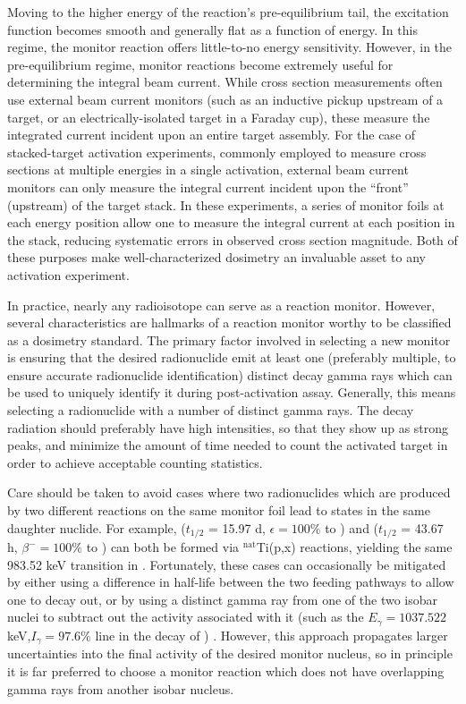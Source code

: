 \documentclass[3p]{elsarticle}
\begin{document}
Moving to the higher energy  of the reaction's pre-equilibrium tail, the excitation function becomes  smooth and generally flat as a function of energy.
In this regime, the monitor reaction offers little-to-no energy sensitivity. 
However,  in the pre-equilibrium regime, monitor reactions become extremely useful for determining the integral beam current. 
While cross section measurements often use external beam current monitors (such as an inductive pickup upstream of a target, or an electrically-isolated target in a Faraday cup), these measure the integrated current incident upon an entire target assembly.
For the case of stacked-target activation experiments, commonly employed to measure cross sections at multiple energies  in a single activation, external beam current monitors can only measure the integral current incident upon the \enquote{front} (upstream) of the target stack.
In these experiments, a series of monitor foils at each energy position allow one to measure the integral current at each position in the stack, reducing systematic errors in observed cross section magnitude.
Both of these purposes make well-characterized dosimetry an invaluable asset to any activation experiment. 



In practice, nearly any radioisotope can serve as a reaction monitor. 
However, several characteristics are hallmarks of a reaction monitor worthy to be classified as a dosimetry standard.
The primary factor involved in selecting a new monitor is ensuring that the desired radionuclide emit  at least one (preferably multiple, to ensure accurate radionuclide identification) distinct decay gamma rays which can be used to uniquely identify it during post-activation assay.  
Generally, this means selecting a radionuclide with a number of distinct gamma rays.
The decay radiation should preferably have high intensities, so that they show up as strong peaks, and minimize the amount of time needed to count the activated target in order to achieve acceptable counting statistics. 

Care should be taken to avoid cases where two radionuclides which are produced by two different reactions on the same monitor foil lead to states in the same daughter nuclide.  
For example,   ($t_{1/2}$ = 15.97 d, $\epsilon=100\%$ to ) and   ($t_{1/2}$ = 43.67 h, $\beta^-=100\%$ to ) can both be formed via $^\text{nat}$Ti(p,x) reactions, yielding the same 983.52 keV transition in  \cite{Burrows2006}.
Fortunately, these cases can occasionally be mitigated by either using a difference in half-life between the two feeding pathways to allow one to decay out, or by using a distinct gamma ray from one of the two isobar nuclei to subtract out the activity associated with it (such as the $E_\gamma=1037.522$ keV,$I_\gamma=97.6\%$ line in the decay of ) \cite{Burrows2006}.
However, this approach propagates larger uncertainties into the final activity of the desired monitor nucleus, so in principle it is far preferred to choose a monitor reaction which does not have overlapping gamma rays from another isobar nucleus.
\end{document}
